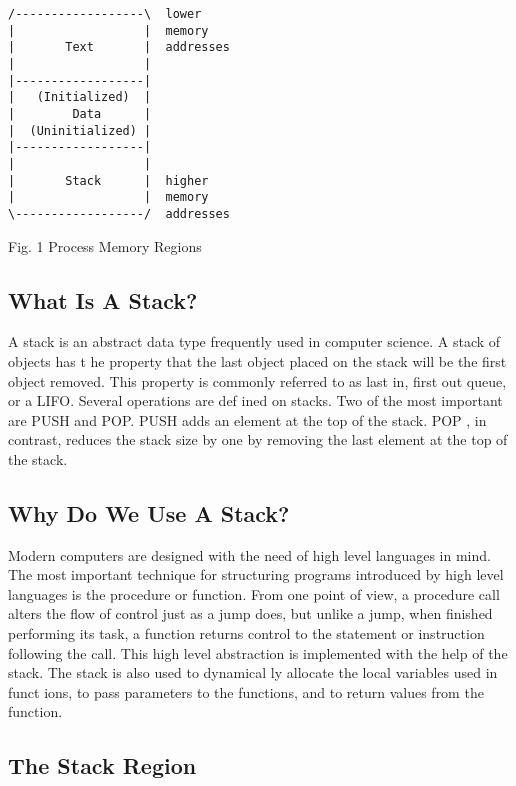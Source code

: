 \documentclass[12pt]{article}
\begin{document}
\begin{lstlisting}[caption=Process Memory Regions]
/------------------\  lower
|                  |  memory
|       Text       |  addresses
|                  |
|------------------|
|   (Initialized)  |
|        Data      |
|  (Uninitialized) |
|------------------|
|                  |
|       Stack      |  higher
|                  |  memory
\------------------/  addresses
\end{lstlisting}

Fig. 1 Process Memory Regions

\subsection{What Is A Stack?}

A stack is an abstract data type frequently used in computer science.  A stack of objects has t he property that the 
last object placed on the stack will be the first object removed. This property is commonly referred to as last in, 
first out queue, or a LIFO. Several operations are def ined on stacks. Two of the most important are PUSH and 
POP. PUSH adds an element at the top of the stack. POP , in contrast, reduces the stack size by one by removing 
the last element at the top of the stack.

\subsection{Why Do We Use A Stack?}

Modern computers are designed with the need of high level languages in mind. The most important technique 
for structuring programs introduced by high level languages is the procedure or function. From one point of 
view, a procedure call alters the flow of control just as a jump does, but unlike a jump, when finished 
performing its task, a function returns control to the statement or instruction following the call. This high level 
abstraction is implemented with the help of the stack. The stack is also used to dynamical ly allocate the local 
variables used in funct ions, to pass parameters to the functions, and to return values from the function.

\subsection{The Stack Region}
\end{document}
